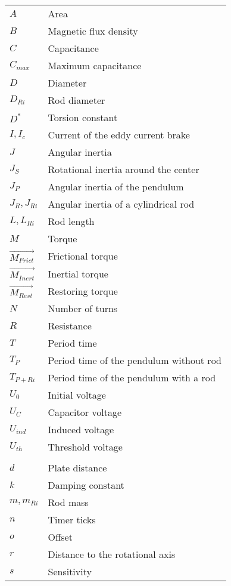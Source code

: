 %
\begin{longtable}[l]{@{}ll@{}}%
	\( A \) & Area\\
	\( B \) & Magnetic flux density\\
	\( C \) & Capacitance\\
	\( C_{max} \) & Maximum capacitance\\
	\( D \) & Diameter\\
	\( D_{Ri} \) & Rod diameter\\
	\( D^* \) & Torsion constant\\
	\( I, I_c \) & Current of the eddy current brake\\
	\( J \) & Angular inertia\\
	\( J_S \) & Rotational inertia around the center\\
	\( J_P \) & Angular inertia of the pendulum\\
	\( J_R, J_{Ri} \) & Angular inertia of a cylindrical rod\\
	\( L, L_{Ri} \) & Rod length\\
	\( M \) & Torque\\
	\( \vec{M_{Frict}} \) & Frictional torque\\
	\( \vec{M_{Inert}} \) & Inertial torque\\
	\( \vec{M_{Rest}} \) & Restoring torque\\
	\( N \) & Number of turns\\
	\( R \) & Resistance\\
	\( T \) & Period time\\
	\( T_P \) & Period time of the pendulum without rod\\
	\( T_{P+Ri} \) & Period time of the pendulum with a rod\\
	\( U_0 \) & Initial voltage\\
	\( U_C \) & Capacitor voltage\\
	\( U_{ind} \) & Induced voltage\\
	\( U_{th} \) & Threshold voltage\\
	\\
	\( d \) & Plate distance\\
	\( k \) & Damping constant\\
	\( m, m_{Ri} \) & Rod mass\\
	\( n \) & Timer ticks\\
	\( o \) & Offset\\
	\( r \) & Distance to the rotational axis\\
	\( s \) & Sensitivity\\

\end{longtable}
